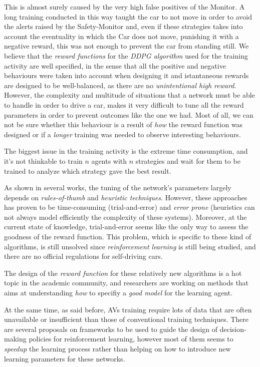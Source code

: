 This is almost surely caused by the very high false positives of the Monitor. A long training conducted in this way taught the car to not move in order to avoid the alerts raised by the Safety-Monitor and, even if these strategies takes into account the eventuality in which the Car does not move, punishing it with a negative reward, this was not enough to prevent the car from standing still.
We believe that the \textsl{reward functions} for the \textsl{DDPG algorithm} used for the training activity are well specified, in the sense that all the positive and negative behaviours were taken into account when designing it and istantaneous rewards are designed to be well-balanced, as there are no \textsl{unintentional high reward}. However, the complexity and multitude of situations that a network must be able to handle in order to drive a car, makes it very difficult to tune all the reward parameters in order to prevent outcomes like the one we had. Most of all, we can not be sure whether this behaviour is a result of \textsl{how} the reward function was designed or if a \textsl{longer} training was needed to observe interesting behaviours.

The biggest issue in the training activity is the extreme time consumption, and it's not thinkable to train $n$ agents with $n$ strategies and wait for them to be trained to analyze which strategy gave the best result.

As shown in several works, the tuning of the network's parameters largely depends on \textsl{rules-of-thumb} and \textsl{heuristic techniques}. However, these approaches has proven to be time-consuming (trial-and-error) and \textsl{error prone} (heuristics can not always model efficiently the complexity of these systems).
Moreover, at the current state of knowledge, trial-and-error seems like the only way to assess the goodness of the reward function. This problem, which is specific to these kind of algorithms, is still unsolved since \textsl{reinforcement learning} is still being studied, and there are no official regulations for self-driving cars. \cite{rewardtrialanderror2}

The design of the \textsl{reward function} for these relatively new algorithms is a hot topic in the academic community, and researchers are working on methods that aims at understanding \textsl{how} to specifiy a \textsl{good model} for the learning agent. \cite{reward1} \cite{reward2} \cite{reward3}

At the same time, as said before, AVs training require lots of data that are often unavailable or insufficient than those of conventional training techniques. There are several proposals on frameworks to be used to guide the design of decision-making policies for reinforcement learning, however most of them seems to \textsl{speedup} the learning process rather than helping on how to introduce new learning parameters for these networks. \cite{rewardtrialanderror1}

